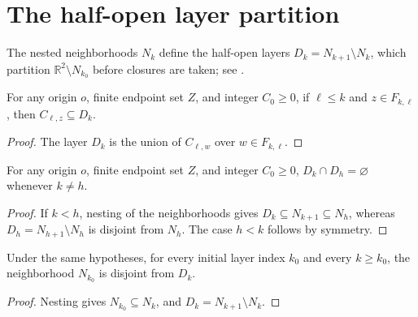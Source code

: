 \section{The half-open layer partition}
\label{sec:area_law_layer_partition}

The nested neighborhoods $N_k$ define the half-open layers
$D_k=N_{k+1}\setminus N_k$, which partition $\mathbb R^2\setminus N_{k_0}$
before closures are taken; see \cite[Section~11]{OpenAI2026AreaLaw}.


\begin{lemma}
    \label{thm:area_law_fine_cell_containment}
    \leanok
    For any origin $o$, finite endpoint set $Z$, and integer $C_0\ge0$, if
    $\ell\le k$ and $z\in F_{k,\ell}$, then $C_{\ell,z}\subseteq D_k$.
\end{lemma}
\begin{proof}\leanok
    The layer $D_k$ is the union of $C_{\ell,w}$ over $w\in F_{k,\ell}$.
\end{proof}

\begin{lemma}
    \label{thm:area_law_layer_pairwise_disjoint}
    \leanok
    For any origin $o$, finite endpoint set $Z$, and integer $C_0\ge0$,
    $D_k\cap D_h=\varnothing$ whenever $k\ne h$.
\end{lemma}
\begin{proof}\leanok
    If $k<h$, nesting of the neighborhoods gives
    $D_k\subseteq N_{k+1}\subseteq N_h$, whereas
    $D_h=N_{h+1}\setminus N_h$ is disjoint from $N_h$. The case $h<k$ follows
    by symmetry.
\end{proof}

\begin{lemma}
    \label{thm:area_law_dummy_layer_disjoint}
    \leanok
    Under the same hypotheses, for every initial layer index $k_0$ and every
    $k\ge k_0$, the neighborhood $N_{k_0}$ is disjoint from $D_k$.
\end{lemma}
\begin{proof}\leanok
    Nesting gives $N_{k_0}\subseteq N_k$, and $D_k=N_{k+1}\setminus N_k$.
\end{proof}

